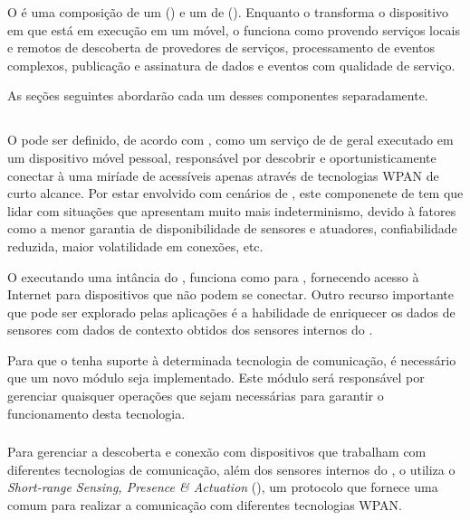 O \mhubcddl é uma composição de um \gateway (\mhub) e um \middleware de \iomt (\cddl). Enquanto o \mhub transforma o dispositivo \android em que está em execução em um \gateway \iot móvel, o \cddl funciona como \middleware provendo serviços locais e remotos de descoberta de provedores de serviços, processamento de eventos complexos, publicação e assinatura de dados e eventos com qualidade de serviço.

As seções seguintes abordarão cada um desses componentes separadamente.

\subsection{\mhub}

O \middleware \mhub pode ser definido, de acordo com , como um serviço de \middleware de \iomt geral executado em um dispositivo móvel pessoal, responsável por descobrir e oportunisticamente conectar à uma miríade de \smartobjs acessíveis apenas através de tecnologias WPAN de curto alcance. Por estar envolvido com cenários de \iomt, este componenete de \software tem que lidar com situações que apresentam muito mais indeterminismo, devido à fatores como a menor garantia de disponibilidade de sensores e atuadores, confiabilidade reduzida, maior volatilidade em conexões, etc.

O \smartphone executando uma intância do \mhub, funciona como \gateway para \smartobjs, fornecendo acesso à Internet para dispositivos que não podem se conectar. Outro recurso importante que pode ser explorado pelas aplicações é a habilidade de enriquecer os dados de sensores com dados de contexto obtidos dos sensores internos do \mhub.

Para que o \mhub tenha suporte à determinada tecnologia de comunicação, é necessário que um novo módulo seja implementado. Este módulo será responsável por gerenciar quaisquer operações que sejam necessárias para garantir o funcionamento desta tecnologia.

\subsubsection{\stwopa} \label{subsub:s2pa}

Para gerenciar a descoberta e conexão com dispositivos que trabalham com diferentes tecnologias de comunicação, além dos sensores internos do \smartphone, o \mhub utiliza o \textit{Short-range Sensing, Presence \& Actuation} (\stwopa), um protocolo que fornece uma \api comum para realizar a comunicação com diferentes tecnologias WPAN.

